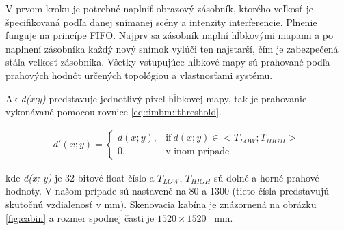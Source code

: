 V prvom kroku je potrebné naplniť obrazový zásobník, ktorého veľkosť je špecifikovaná podľa danej snímanej scény a intenzity interferencie. Plnenie funguje na princípe FIFO. Najprv sa zásobník naplní hĺbkovými mapami a po naplnení zásobníka každý nový snímok vylúči ten najstarší, čím je zabezpečená stála veľkosť zásobníka. 
Všetky vstupujúce hĺbkové mapy sú prahované podľa prahových hodnôt určených topológiou a vlastnosťami systému.  

Ak \textit{d(x;y)} predstavuje jednotlivý pixel hĺbkovej mapy, tak je prahovanie vykonávané pomocou rovnice \ref{eq::imbm::threshold}.

\begin{equation}
\label{eq::imbm::threshold}
\begin{aligned}
d'(x;y)=
\begin{cases}
d(x;y), & \text{if}\ d(x;y) \in < T_{LOW}; T_{HIGH}> \\
0, & \text{v inom prípade}
\end{cases}
\end{aligned}
\end{equation}

kde \textit{d(x; y)} je 32-bitové float číslo a $T_{LOW}$, $T_ {HIGH}$ sú dolné a horné prahové hodnoty. V našom prípade sú nastavené na 80 a 1300 (tieto čísla predstavujú skutočnú vzdialenosť v mm). Skenovacia kabína je znázornená na obrázku \ref {fig:cabin} a rozmer spodnej časti je $ 1520 \times 1520$ \, mm.

